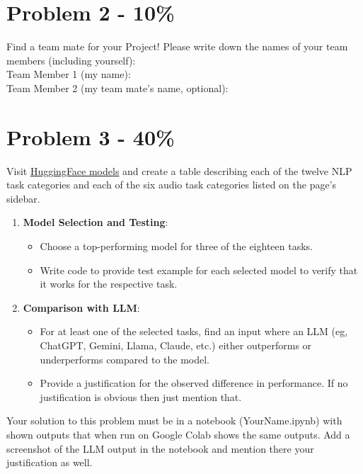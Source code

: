 \documentclass{article}
\newcommand{\answerboxbig}{
    \vspace{20cm} %
}
\begin{document}
\answerboxbig

\section*{Problem 2 - 10\%}
Find a team mate for your Project! 
Please write down the names of your team members (including yourself):\\
Team Member 1 (my name):\\
Team Member 2 (my team mate's name, optional):

\section*{Problem 3 - 40\%}
Visit \href{https://huggingface.co/models}{HuggingFace models} and create a table describing each of the twelve NLP task categories and each of the six audio task categories listed on the page's sidebar.

\begin{enumerate}
    \item \textbf{Model Selection and Testing}:
    \begin{itemize}
        \item Choose a top-performing model for three of the eighteen tasks.
        \item Write code to provide test example for each selected model to verify that it works for the respective task.
    \end{itemize}

    \item \textbf{Comparison with LLM}:
    \begin{itemize}
        \item For at least one of the selected tasks, find an input where an LLM (eg, ChatGPT, Gemini, Llama, Claude, etc.) either outperforms or underperforms compared to the model.
        \item Provide a justification for the observed difference in performance. If no justification is obvious then just mention that.
    \end{itemize}
\end{enumerate}
Your solution to this problem must be in a notebook (\<YourName\>.ipynb) with shown outputs that when run on Google Colab shows the same outputs. Add a screenshot of the LLM output in the notebook and mention there your justification as well.
\end{document}
